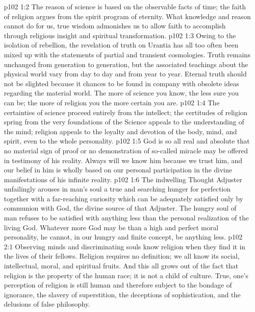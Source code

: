 \vs p102 1:2 The reason of science is based on the observable facts of time; the faith of religion argues from the spirit program of eternity. What knowledge and reason cannot do for us, true wisdom admonishes us to allow faith to accomplish through religious insight and spiritual transformation.
\vs p102 1:3 Owing to the isolation of rebellion, the revelation of truth on Urantia has all too often been mixed up with the statements of partial and transient cosmologies. Truth remains unchanged from generation to generation, but the associated teachings about the physical world vary from day to day and from year to year. Eternal truth should not be slighted because it chances to be found in company with obsolete ideas regarding the material world. The more of science you know, the less sure you can be; the more of religion you  the more certain you are.
\vs p102 1:4 The certainties of science proceed entirely from the intellect; the certitudes of religion spring from the very foundations of the  Science appeals to the understanding of the mind; religion appeals to the loyalty and devotion of the body, mind, and spirit, even to the whole personality.
\vs p102 1:5 \pc God is so all real and absolute that no material sign of proof or no demonstration of so\hyp{}called miracle may be offered in testimony of his reality. Always will we know him because we trust him, and our belief in him is wholly based on our personal participation in the divine manifestations of his infinite reality.
\vs p102 1:6 \pc The indwelling Thought Adjuster unfailingly arouses in man’s soul a true and searching hunger for perfection together with a far\hyp{}reaching curiosity which can be adequately satisfied only by communion with God, the divine source of that Adjuster. The hungry soul of man refuses to be satisfied with anything less than the personal realization of the living God. Whatever more God may be than a high and perfect moral personality, he cannot, in our hungry and finite concept, be anything less.
\vs p102 2:1 Observing minds and discriminating souls know religion when they find it in the lives of their fellows. Religion requires no definition; we all know its social, intellectual, moral, and spiritual fruits. And this all grows out of the fact that religion is the property of the human race; it is not a child of culture. True, one’s perception of religion is still human and therefore subject to the bondage of ignorance, the slavery of superstition, the deceptions of sophistication, and the delusions of false philosophy.
